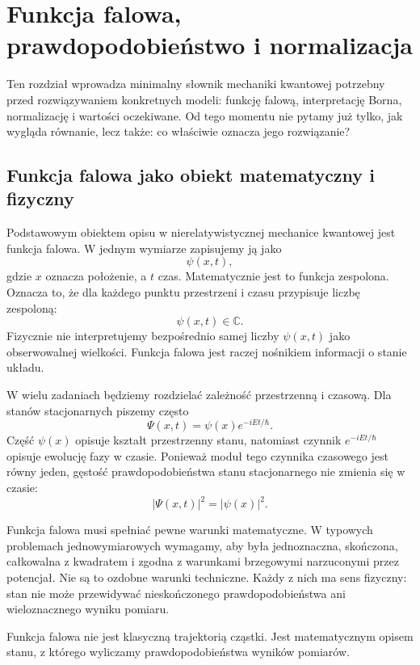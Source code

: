 \chapter{Funkcja falowa, prawdopodobieństwo i normalizacja}

\begin{remarkbox}
Ten rozdział wprowadza minimalny słownik mechaniki kwantowej potrzebny przed
rozwiązywaniem konkretnych modeli: funkcję falową, interpretację Borna,
normalizację i wartości oczekiwane. Od tego momentu nie pytamy już tylko,
jak wygląda równanie, lecz także: co właściwie oznacza jego rozwiązanie?
\end{remarkbox}

\section{Funkcja falowa jako obiekt matematyczny i fizyczny}

Podstawowym obiektem opisu w nierelatywistycznej mechanice kwantowej jest funkcja falowa. W jednym wymiarze zapisujemy ją jako
\[
    \psi(x,t),
\]
gdzie \(x\) oznacza położenie, a \(t\) czas. Matematycznie jest to funkcja zespolona. Oznacza to, że dla każdego punktu przestrzeni i czasu przypisuje liczbę zespoloną:
\[
    \psi(x,t)\in\mathbb{C}.
\]
Fizycznie nie interpretujemy bezpośrednio samej liczby \(\psi(x,t)\) jako obserwowalnej wielkości. Funkcja falowa jest raczej nośnikiem informacji o stanie układu.

W wielu zadaniach będziemy rozdzielać zależność przestrzenną i czasową. Dla stanów stacjonarnych piszemy często
\[
    \Psi(x,t)=\psi(x)e^{-iEt/\hbar}.
\]
Część \(\psi(x)\) opisuje kształt przestrzenny stanu, natomiast czynnik \(e^{-iEt/\hbar}\) opisuje ewolucję fazy w czasie. Ponieważ moduł tego czynnika czasowego jest równy jeden, gęstość prawdopodobieństwa stanu stacjonarnego nie zmienia się w czasie:
\[
    |\Psi(x,t)|^2=|\psi(x)|^2.
\]

Funkcja falowa musi spełniać pewne warunki matematyczne. W typowych problemach jednowymiarowych wymagamy, aby była jednoznaczna, skończona, całkowalna z kwadratem i zgodna z warunkami brzegowymi narzuconymi przez potencjał. Nie są to ozdobne warunki techniczne. Każdy z nich ma sens fizyczny: stan nie może przewidywać nieskończonego prawdopodobieństwa ani wieloznacznego wyniku pomiaru.

\begin{summarybox}
Funkcja falowa nie jest klasyczną trajektorią cząstki. Jest matematycznym opisem stanu, z którego wyliczamy prawdopodobieństwa wyników pomiarów.
\end{summarybox}

